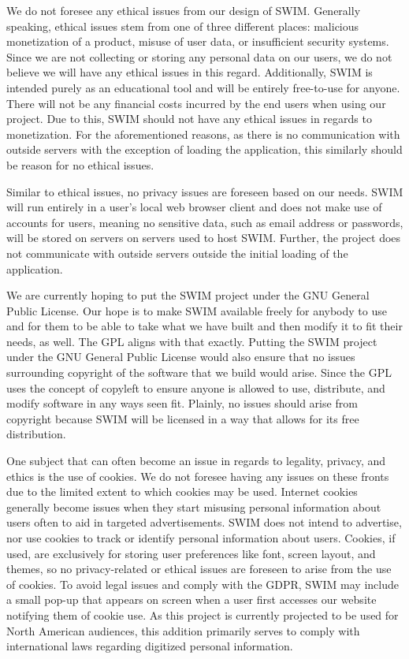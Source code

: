 \documentclass[
    parskip=half,
    fontsize=12pt,
    titlepage=firstiscover,
    toc=bibliography,
    numbers=endperiod
]{scrartcl}
\begin{document}
We do not foresee any ethical issues from our design of SWIM. Generally speaking, ethical issues stem from one of three different places: malicious monetization of a product, misuse of user data, or insufficient security systems. Since we are not collecting or storing any personal data on our users, we do not believe we will have any ethical issues in this regard. Additionally, SWIM is intended purely as an educational tool and will be entirely free-to-use for anyone. There will not be any financial costs incurred by the end users when using our project. Due to this, SWIM should not have any ethical issues in regards to monetization. For the aforementioned reasons, as there is no communication with outside servers with the exception of loading the application, this similarly should be reason for no ethical issues.

Similar to ethical issues, no privacy issues are foreseen based on our needs. SWIM will run entirely in a user's local web browser client and does not make use of accounts for users, meaning no sensitive data, such as email address or passwords, will be stored on servers on servers used to host SWIM. Further, the project does not communicate with outside servers outside the initial loading of the application.

We are currently hoping to put the SWIM project under the GNU General Public License. Our hope is to make SWIM available freely for anybody to use and for them to be able to take what we have built and then modify it to fit their needs, as well. The GPL aligns with that exactly.  Putting the SWIM project under the GNU General Public License would also ensure that no issues surrounding copyright of the software that we build would arise. Since the GPL uses the concept of copyleft to ensure anyone is allowed to use, distribute, and modify software in any ways seen fit. Plainly, no issues should arise from copyright because SWIM will be licensed in a way that allows for its free distribution.

One subject that can often become an issue in regards to legality, privacy, and ethics is the use of cookies. We do not foresee having any issues on these fronts due to the limited extent to which cookies may be used. Internet cookies generally become issues when they start misusing personal information about users often to aid in targeted advertisements. SWIM does not intend to advertise, nor use cookies to track or identify personal information about users. Cookies, if used, are exclusively for storing user preferences like font, screen layout, and themes, so no privacy-related or ethical issues are foreseen to arise from the use of cookies. To avoid legal issues and comply with the GDPR, SWIM may include a small pop-up that appears on screen when a user first accesses our website notifying them of cookie use. As this project is currently projected to be used for North American audiences, this addition primarily serves to comply with international laws regarding digitized personal information.
\end{document}
